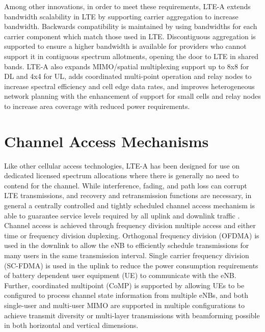 Among other innovations, in order to meet these requirements, LTE-A extends bandwidth scalability in LTE by supporting carrier aggregation to increase bandwidth. Backwards compatibility is maintained by using bandwidths for each carrier component which match those used in LTE.  Discontiguous aggregation is supported to ensure a higher bandwidth is available for providers who cannot support it in contiguous spectrum allotments, opening the door to LTE in shared bands.  LTE-A also expands MIMO/spatial multiplexing support up to 8x8 for DL and 4x4 for UL, adds coordinated multi-point operation and relay nodes to increase spectral efficiency and cell edge data rates, and improves heterogeneous network planning with the enhancement of support for small cells and relay nodes to increase area coverage with reduced power requirements.

\section{Channel Access Mechanisms}
\label{channel-access}
Like other cellular access technologies, LTE-A has been designed for use on dedicated licensed spectrum allocations where there is generally no need to contend for the channel.  While interference, fading, and path loss can corrupt LTE transmissions, and recovery and retransmission functions are necessary, in general a centrally controlled and tightly scheduled channel access mechanism is able to guarantee service levels required by all uplink and downlink traffic \cite{tr36300}.  Channel access is achieved through frequency division multiple access and either time or frequency division duplexing.  Orthogonal frequency division (OFDMA) is used in the downlink to allow the eNB to efficiently schedule transmissions for many users in the same transmission interval.  Single carrier frequency division (SC-FDMA) is used in the uplink to reduce the power consumption requirements of battery dependent user equipment (UE) to communicate with the eNB.  Further, coordinated multipoint (CoMP) is supported by allowing UEs to be configured to process channel state information from multiple eNBs, and both single-user and multi-user MIMO are supported in multiple configurations to achieve transmit diversity or multi-layer transmissions with beamforming possible in both horizontal and vertical dimensions.

